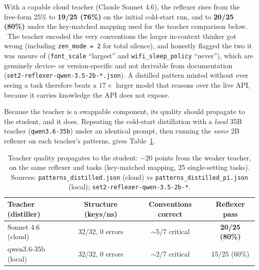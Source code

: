With a capable cloud teacher (Claude Sonnet 4.6), the reflexer rises from the
free-form 25\% to \textbf{19/25 (76\%)} on the initial cold-start run, and to
\textbf{20/25 (80\%)} under the key-matched mapping used for the teacher
comparison below.%
\ The teacher encoded the very conventions the larger in-context thinker got
wrong (including \texttt{zen\_mode = 2} for total silence), and honestly flagged
the two it was unsure of (\texttt{font\_scale} ``largest'' and
\texttt{wifi\_sleep\_policy} ``never''), which are genuinely device- or
version-specific and not derivable from documentation
(\texttt{set2-reflexer-qwen-3.5-2b-*.json}). A distilled pattern minted without
ever seeing a task therefore beats a $17\times$ larger model that reasons over
the live API, because it carries knowledge the API does not expose.

Because the teacher is a swappable component, its quality should propagate to the
student, and it does. Repeating the cold-start distillation with a \emph{local}
35B teacher (\texttt{qwen3.6-35b}) under an identical prompt, then running the
\emph{same} 2B reflexer on each teacher's patterns, gives Table~\ref{tab:teacher}.

\begin{table}[t]
\centering
\caption{Teacher quality propagates to the student: $-20$ points from the weaker
teacher, on the same reflexer and tasks (key-matched mapping, 25 single-setting
tasks). Sources: \texttt{patterns\_distilled.json} (cloud) vs
\texttt{patterns\_distilled\_pi.json} (local); \texttt{set2-reflexer-qwen-3.5-2b-*}.}
\label{tab:teacher}
\begin{tabular}{lccc}
\toprule
Teacher (distiller) & Structure (keys/ns) & Conventions correct & Reflexer pass \\
\midrule
Sonnet 4.6 (cloud) & 32/32, 0 errors & $\sim$5/7 critical & \textbf{20/25 (80\%)} \\
qwen3.6-35b (local) & 32/32, 0 errors & $\sim$2/7 critical & 15/25 (60\%) \\
\bottomrule
\end{tabular}
\end{table}

